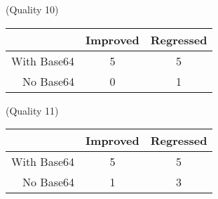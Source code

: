 \begin{minipage}{0.475\textwidth}
	\centering
	
	\caption*{(Quality 10)}
	
	\begin{tabular}{r|c|c}
		            & Improved & Regressed \\ \hline
		With Base64 &    5     &     5     \\
		  No Base64 &    0     &     1
	\end{tabular}

\end{minipage}%
\begin{minipage}{0.475\textwidth}
	\centering
	
	\caption*{(Quality 11)}
	
	\begin{tabular}{r|c|c}
		            & Improved & Regressed \\ \hline
		With Base64 &    5     &     5     \\
		  No Base64 &    1     &     3
	\end{tabular}

\end{minipage}